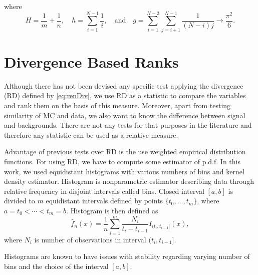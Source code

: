 where
\begin{equation}
H = \frac{1}{m}+\frac{1}{n},\quad	h = \sum_{i=1}^{N-1}\frac{1}{i},\quad \mathrm{ and } \quad g = \sum_{i=1}^{N-2}\sum_{j=i+1}^{N-1}\frac{1}{(N-i)j}\rightarrow \frac{\pi^2}{6}.
\end{equation}

\section{\ren Divergence Based Ranks}
Although there has not been devised any specific test applying the \ren divergence (RD)  defined by \eqref{eq:renDiv}, we use RD as a statistic to compare the variables and rank them on the basis of this measure. %
Moreover, apart from testing similarity of MC and data, we also want to know the difference between signal and backgrounds. There are not any tests for that purposes in the literature and therefore any statistic can be used as a relative measure. 

Advantage of previous tests over RD is the use weighted empirical distribution functions. For using RD, we have to compute some estimator of p.d.f. In this work, we used equidistant histograms with various numbers of bins and kernel density estimator. Histogram is nonparametric estimator describing data through relative frequency in disjoint intervals called bins. Closed interval $[a,b]$ is divided to $m$ equidistant intervals defined by points $\lbrace t_0, \ldots, t_m \rbrace$, where $a = t_0 < \cdots < t_m = b.$ Histogram is then defined as 
\begin{equation}
\hat{f}_n(x) = \frac{1}{n} \sum_{i=1}^m \frac{N_i}{t_i - t_{i-1}} I_{(t_i, t_{i-1}]}(x),
\end{equation}
where $N_i$ is number of observations in interval $(t_i, t_{i-1}]$. 

Histograms are known to have issues with stability regarding varying number of bins and  the choice of the interval $[a,b]$.

